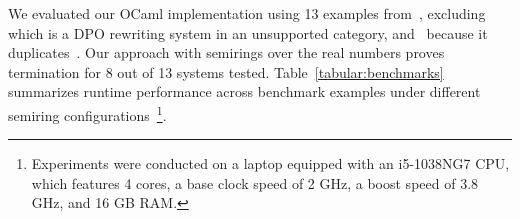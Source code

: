 We evaluated our OCaml implementation using 13 examples from~\cite{endrullis2024generalized_arxiv_v2,plump1995ontermination,plump2018modular,bruggink2015proving,bruggink2014termination}, excluding~\cite[Example 6.4]{endrullis2024generalized_arxiv_v2} which is a DPO rewriting system in an unsupported category, and~\cite[Example 6]{bruggink2014termination} because it duplicates~\cite[Example 4]{bruggink2015proving}. Our approach with semirings over the real numbers proves termination for 8 out of 13 systems tested. Table~\ref{tabular:benchmarks} summarizes runtime performance 
across benchmark examples under different semiring configurations~\footnote{Experiments were conducted on a laptop equipped with an i5-1038NG7 CPU, which features 4 cores, a base clock speed of 2 GHz, a boost speed of 3.8 GHz, and 16 GB RAM.}.


